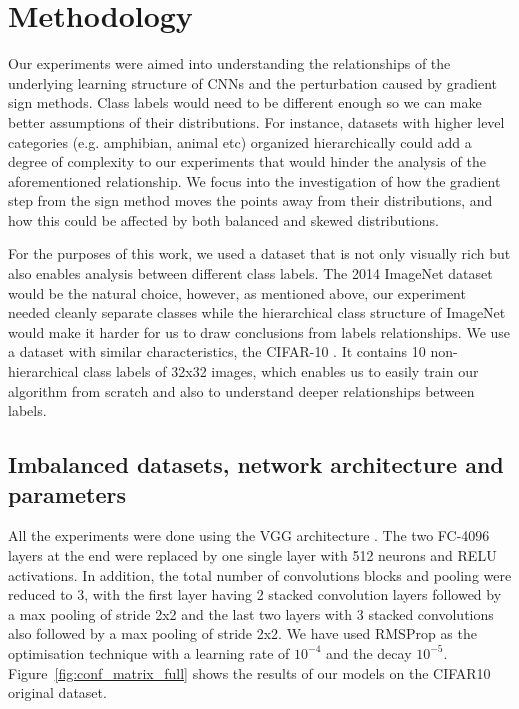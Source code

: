 \documentclass[runningheads,a4paper]{llncs}
\begin{document}
\section{Methodology}

Our experiments were aimed into understanding the relationships of the underlying learning structure of CNNs and the perturbation caused by gradient sign methods. Class labels would need to be different enough so we can make better assumptions of their distributions. For instance, datasets with higher level categories (e.g. amphibian, animal etc) organized hierarchically could add a degree of complexity to our experiments that would hinder the analysis of the aforementioned relationship. We focus into the investigation of how the gradient step from the sign method moves the points away from their distributions, and how this could be affected by both balanced and skewed distributions.

For the purposes of this work, we used a dataset that is not only visually rich but also enables analysis between different class labels. The 2014 ImageNet dataset \cite{deng2009imagenet} would be the natural choice, however, as mentioned above, our experiment needed cleanly separate classes while the hierarchical class structure of ImageNet would make it harder for us to draw conclusions from labels relationships. We use a dataset with similar characteristics, the CIFAR-10 \cite{krizhevsky_2009}. It contains 10 non-hierarchical class labels of 32x32 images, which enables us to easily train our algorithm from scratch and also to understand deeper relationships between labels.
\subsection{Imbalanced datasets, network architecture and parameters}

All the experiments were done using the VGG architecture \cite{simonyan2014very}. The two FC-4096 layers at the end were replaced by one single layer with 512 neurons and RELU activations. In addition, the total number of convolutions blocks and pooling were reduced to 3, with the first layer having 2 stacked convolution layers followed by a max pooling of stride 2x2 and the last two layers with 3 stacked convolutions also followed by a max pooling of stride 2x2. We have used RMSProp  \cite{bengiormsprop} as the optimisation technique with a learning rate of $10^{-4}$ and the decay $10^{-5}$. Figure~\ref{fig:conf_matrix_full} shows the results of our models on the CIFAR10 original dataset.
\end{document}
